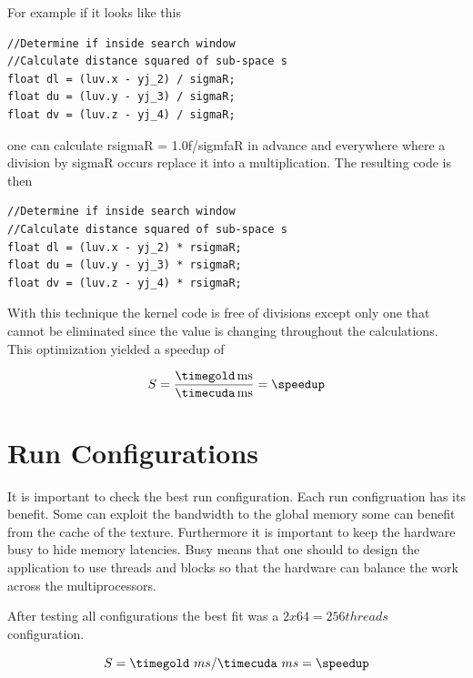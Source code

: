 For example if it looks like this
\begin{lstlisting}[caption=Expensive divison, label=lst:division]
//Determine if inside search window
//Calculate distance squared of sub-space s
float dl = (luv.x - yj_2) / sigmaR;               
float du = (luv.y - yj_3) / sigmaR;               
float dv = (luv.z - yj_4) / sigmaR;
\end{lstlisting}
one can calculate \textsf{rsigmaR} = 1.0f/\textsf{sigmfaR} in advance and everywhere where a
division by \textsf{sigmaR} occurs replace it into a multiplication. The
resulting code is then
\begin{lstlisting}[caption=Division turned into fast multiplication, label=lst:precalcdivision]
//Determine if inside search window
//Calculate distance squared of sub-space s
float dl = (luv.x - yj_2) * rsigmaR;               
float du = (luv.y - yj_3) * rsigmaR;               
float dv = (luv.z - yj_4) * rsigmaR;
\end{lstlisting}

With this technique the kernel code is free of divisions except only one that
cannot be eliminated since the value is changing throughout the calculations.
This optimization yielded a speedup of

\fpDiv{\speedup}{\timegold}{\timecuda}
\begin{equation*}\label{eq:speedup3}
	S = \frac{\unit[\timegold]{ms}}{\unit[\timecuda]{ms}} = \speedup
\end{equation*}


\section{Run Configurations} %
\label{sec:run_configurations}

It is important to check the best run configuration. Each run configruation 
has its benefit. Some can exploit the bandwidth to the global memory some can
benefit from the cache of the texture. Furthermore it is important to keep the
hardware busy to hide memory latencies. Busy means that one should to design 
the application to use threads and blocks so that the hardware can balance the 
work across the multiprocessors. 

After testing all configurations the 
best fit was a $2x64=256 threads$ configuration.

\fpDiv{\speedup}{\timegold}{\timecuda}
\begin{equation*}\label{eq:speedup4}
	S = \timegold\ ms/\timecuda\ ms = \speedup
\end{equation*}


